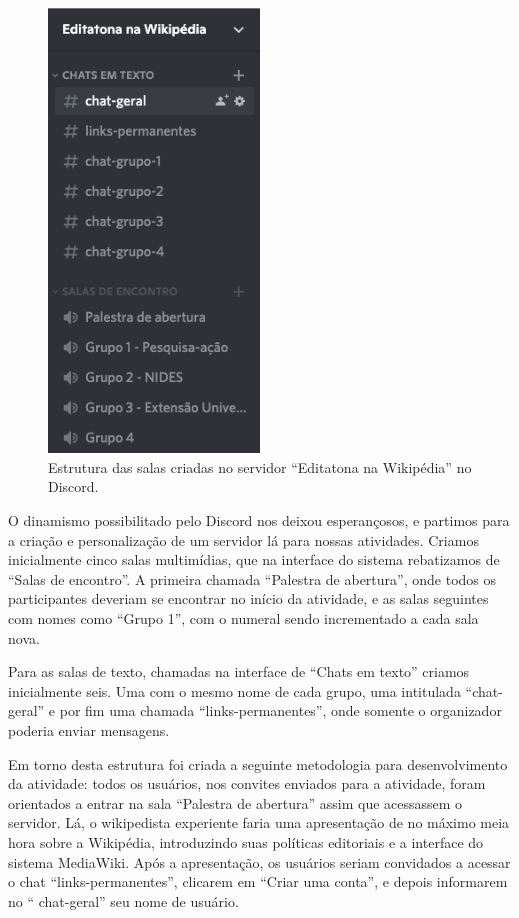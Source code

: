 \begin{figure}[H]
    \centering
    \includegraphics[width=0.5\textwidth]{Images/discord_channels.png}
    \caption{Estrutura das salas criadas no servidor “Editatona na Wikipédia” no Discord.}
    \label{fig:estrutura_discord}
\end{figure}

 O dinamismo possibilitado pelo Discord nos deixou esperançosos, e partimos para a criação e personalização de um servidor lá para nossas atividades. Criamos inicialmente cinco salas multimídias, que na interface do sistema rebatizamos de “Salas de encontro”. A primeira chamada “Palestra de abertura”, onde todos os participantes deveriam se encontrar no início da atividade, e as salas seguintes com nomes como “Grupo 1”, com o numeral sendo incrementado a cada sala nova.
 
 Para as salas de texto, chamadas na interface de “Chats em texto” criamos inicialmente seis. Uma com o mesmo nome de cada grupo, uma intitulada “chat-geral” e por fim uma chamada “links-permanentes”, onde somente o organizador poderia enviar mensagens.
 
 Em torno desta estrutura foi criada a seguinte metodologia para desenvolvimento da atividade: todos os usuários, nos convites enviados para a atividade, foram orientados a entrar na sala “Palestra de abertura” assim que acessassem o servidor. Lá, o wikipedista experiente faria uma apresentação de no máximo meia hora sobre a Wikipédia, introduzindo suas políticas editoriais e a interface do sistema MediaWiki. Após a apresentação, os usuários seriam convidados a acessar o chat “links-permanentes”, clicarem em “Criar uma conta”, e depois informarem no “ chat-geral” seu nome de usuário.
 

